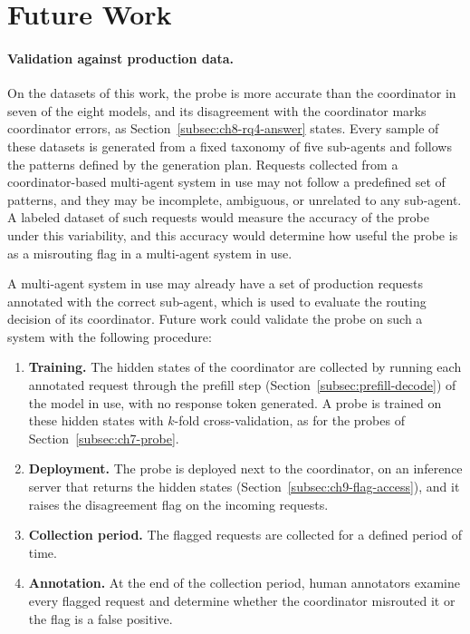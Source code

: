 \section{Future Work}
\label{sec:ch9-future-work}

\paragraph{Validation against production data.} On the datasets of this work, the probe is more accurate than the coordinator in seven of the eight models, and its disagreement with the coordinator marks coordinator errors, as Section~\ref{subsec:ch8-rq4-answer} states. Every sample of these datasets is generated from a fixed taxonomy of five sub-agents and follows the patterns defined by the generation plan. Requests collected from a coordinator-based multi-agent system in use may not follow a predefined set of patterns, and they may be incomplete, ambiguous, or unrelated to any sub-agent. A labeled dataset of such requests would measure the accuracy of the probe under this variability, and this accuracy would determine how useful the probe is as a misrouting flag in a multi-agent system in use.

A multi-agent system in use may already have a set of production requests annotated with the correct sub-agent, which is used to evaluate the routing decision of its coordinator. Future work could validate the probe on such a system with the following procedure:

\begin{enumerate}
    \item \textbf{Training.} The hidden states of the coordinator are collected by running each annotated request through the prefill step (Section~\ref{subsec:prefill-decode}) of the model in use, with no response token generated. A probe is trained on these hidden states with $k$-fold cross-validation, as for the probes of Section~\ref{subsec:ch7-probe}.
    \item \textbf{Deployment.} The probe is deployed next to the coordinator, on an inference server that returns the hidden states (Section~\ref{subsec:ch9-flag-access}), and it raises the disagreement flag on the incoming requests.
    \item \textbf{Collection period.} The flagged requests are collected for a defined period of time.
    \item \textbf{Annotation.} At the end of the collection period, human annotators examine every flagged request and determine whether the coordinator misrouted it or the flag is a false positive.
\end{enumerate}

